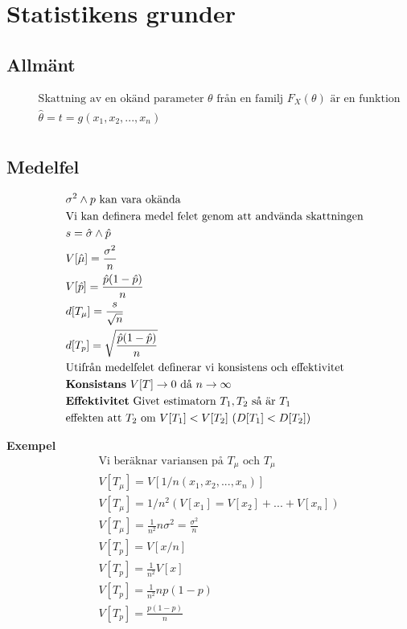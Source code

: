 \section{Statistikens grunder}
\subsection{Allmänt}
\begin{align*}
  &\quad  \text{Skattning av en okänd parameter $\theta$ från en familj  $F_X(\theta)$ är en funktion}  \\
  &\quad  \hat{\theta} = t = g(x_1,x_2,...,x_n) \\
\end{align*}

\subsection{Medelfel}
\begin{align*}
  &\quad  \sigma^2 \land p \text{ kan vara okända}\\
  &\quad  \text{Vi kan definera medel felet genom att andvända skattningen} \\
  &\quad  s=\hat{\sigma} \land \hat{p} \\
  &\quad  V[\hat{\mu}]=\frac{\sigma^2}{n}  \\
  &\quad  V[\hat{p}]  =  \frac{\hat{p}(1-\hat{p})}{n} \\
  &\quad  d[T_{\mu}]   = \frac{s}{\sqrt{n}} \\
  &\quad  d[T_{p}]     = \sqrt{\frac{\hat{p}(1-\hat{p})}{n}} \\
  &\quad  \text{Utifrån medelfelet definerar vi konsistens och effektivitet} \\
  &\quad  \text{\textbf{Konsistans} $V[T]\to0$ då $n\to\infty$} \\
  &\quad  \text{\textbf{Effektivitet} Givet estimatorn $T_1,T_2$ så är $T_1$} \\
  &\quad  \text{effekten att $T_2$ om $V[T_1]<V[T_2]$ ($D[T_1]<D[T_2]$)} \\
\end{align*}

\textbf{Exempel}
\begin{align*}
  &\quad  \text{Vi beräknar variansen på $T_{\mu}$ och $T_{\mu}$}  \\
  &\quad  V[T_{\mu}] = V[1/n(x_1,x_2,...,x_n)] \\
  &\quad  V[T_{\mu}] = 1/n^2(V[x_1] = V[x_2] + ... +V[x_n]) \\
  &\quad  V[T_{\mu}] = \frac{1}{n^2} n\sigma^2 = \frac{\sigma^2}{n} \\
  &\quad  V[T_{p}] = V[x/n] \\
  &\quad  V[T_{p}] = \frac{1}{n^2}V[x] \\
  &\quad  V[T_{p}] = \frac{1}{n^2} np(1-p) \\
  &\quad  V[T_{p}] = \frac{p(1-p)}{n} \\
\end{align*}

